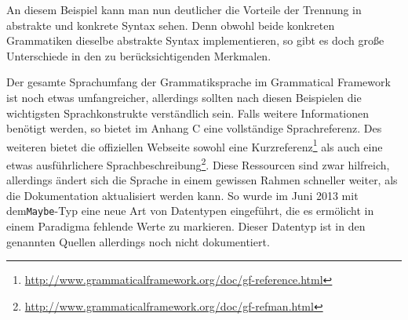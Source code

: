 An diesem Beispiel kann man nun deutlicher die Vorteile der Trennung in abstrakte und konkrete Syntax sehen. Denn obwohl beide konkreten Grammatiken dieselbe abstrakte Syntax implementieren, so gibt es doch große Unterschiede in den zu berücksichtigenden Merkmalen. \par
Der gesamte Sprachumfang der Grammatiksprache im Grammatical Framework ist noch etwas umfangreicher, allerdings sollten nach diesen Beispielen die wichtigsten Sprachkonstrukte verständlich sein. Falls weitere Informationen benötigt werden, so bietet \cite{RANTA2011} im Anhang C eine vollständige Sprachreferenz. Des weiteren bietet die offiziellen Webseite sowohl eine Kurzreferenz\footnote{\url{http://www.grammaticalframework.org/doc/gf-reference.html}} als auch eine etwas ausführlichere Sprachbeschreibung\footnote{\url{http://www.grammaticalframework.org/doc/gf-refman.html}}. Diese Ressourcen sind zwar hilfreich, allerdings ändert sich die Sprache in einem gewissen Rahmen schneller weiter, als die Dokumentation aktualisiert werden kann. So wurde im Juni 2013 mit dem\texttt{Maybe}-Typ eine neue Art von Datentypen eingeführt, die es ermölicht in einem Paradigma fehlende Werte zu markieren. Dieser Datentyp ist in den genannten Quellen allerdings noch nicht dokumentiert.
\FloatBarrier
\pagebreak
